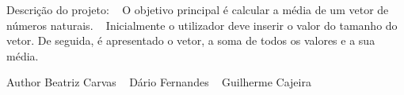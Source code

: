 Descrição do projeto\+: ~\newline
O objetivo principal é calcular a média de um vetor de números naturais. ~\newline
Inicialmente o utilizador deve inserir o valor do tamanho do vetor. De seguida, é apresentado o vetor, a soma de todos os valores e a sua média. ~\newline
 \begin{DoxyAuthor}{Author}
Beatriz Carvas ~\newline
 Dário Fernandes ~\newline
 Guilherme Cajeira 
\end{DoxyAuthor}
